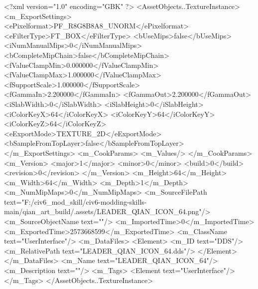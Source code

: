 <?xml version="1.0" encoding="GBK" ?>
<AssetObjects..TextureInstance>
	<m_ExportSettings>
		<ePixelformat>PF_R8G8B8A8_UNORM</ePixelformat>
		<eFilterType>FT_BOX</eFilterType>
		<bUseMips>false</bUseMips>
		<iNumManualMips>0</iNumManualMips>
		<bCompleteMipChain>false</bCompleteMipChain>
		<fValueClampMin>0.000000</fValueClampMin>
		<fValueClampMax>1.000000</fValueClampMax>
		<fSupportScale>1.000000</fSupportScale>
		<fGammaIn>2.200000</fGammaIn>
		<fGammaOut>2.200000</fGammaOut>
		<iSlabWidth>0</iSlabWidth>
		<iSlabHeight>0</iSlabHeight>
		<iColorKeyX>64</iColorKeyX>
		<iColorKeyY>64</iColorKeyY>
		<iColorKeyZ>64</iColorKeyZ>
		<eExportMode>TEXTURE_2D</eExportMode>
		<bSampleFromTopLayer>false</bSampleFromTopLayer>
	</m_ExportSettings>
	<m_CookParams>
		<m_Values/>
	</m_CookParams>
	<m_Version>
		<major>1</major>
		<minor>0</minor>
		<build>0</build>
		<revision>0</revision>
	</m_Version>
	<m_Height>64</m_Height>
	<m_Width>64</m_Width>
	<m_Depth>1</m_Depth>
	<m_NumMipMaps>0</m_NumMipMaps>
	<m_SourceFilePath text="F:/civ6_mod_skill/civ6-modding-skills-main/qian_art_build/.assets/LEADER_QIAN_ICON_64.png"/>
	<m_SourceObjectName text=""/>
	<m_ImportedTime>0</m_ImportedTime>
	<m_ExportedTime>2573668599</m_ExportedTime>
	<m_ClassName text="UserInterface"/>
	<m_DataFiles>
		<Element>
			<m_ID text="DDS"/>
			<m_RelativePath text="LEADER_QIAN_ICON_64.dds"/>
		</Element>
	</m_DataFiles>
	<m_Name text="LEADER_QIAN_ICON_64"/>
	<m_Description text=""/>
	<m_Tags>
		<Element text="UserInterface"/>
	</m_Tags>
</AssetObjects..TextureInstance>
